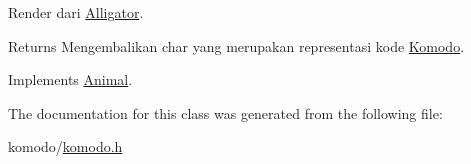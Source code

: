 Render dari \hyperlink{classAlligator}{Alligator}. 

\begin{DoxyReturn}{Returns}
Mengembalikan char yang merupakan representasi kode \hyperlink{classKomodo}{Komodo}. 
\end{DoxyReturn}


Implements \hyperlink{classAnimal_a43a47c0f41d211128e04abc6add53def}{Animal}.



The documentation for this class was generated from the following file\+:\begin{DoxyCompactItemize}
\item 
komodo/\hyperlink{komodo_8h}{komodo.\+h}\end{DoxyCompactItemize}
